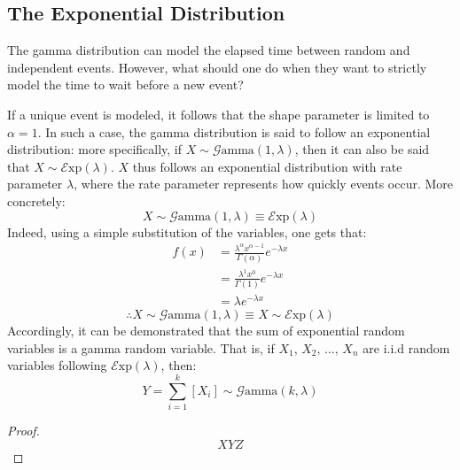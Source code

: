 \documentclass[12pt]{article}
\newcommand{\E}{\mathcal{E}}
\newcommand{\G}{\mathcal{G}}
\begin{document}
\pagebreak
\subsection{The Exponential Distribution }
The gamma distribution can model the elapsed time between random and independent events. However, what should one do
when they want to strictly model the time to wait before a new event?

If a unique event is modeled, it follows that the shape parameter is limited to $\alpha = 1$. In such a case, the gamma
distribution is said to follow an exponential distribution: more specifically, if $X\sim\G\text{amma}(1, \lambda)$, then
it can also be said that $X\sim\E\text{xp}(\lambda)$. $X$ thus follows an exponential distribution with rate parameter
$\lambda$, where the rate parameter represents how quickly events occur. More concretely:
\begin{equation}
	X\sim\G\text{amma}(1, \lambda)\equiv\E\text{xp}(\lambda)
\end{equation}
Indeed, using a simple substitution of the variables, one gets that:
\begin{equation}\label{eq:relation:exp}
	\begin{split}
		f(x)	&=	\frac{\lambda^\alpha x^{\alpha-1}}{\Gamma(\alpha)}e^{-\lambda x}\\
				&=	\frac{\lambda^1 x^{0}}{\Gamma(1)}e^{-\lambda x}\\
				&=	\lambda e^{-\lambda x}
	\end{split}
\end{equation}
\begin{equation}
	\therefore X\sim\G\text{amma}(1, \lambda)\equiv X\sim\E\text{xp}(\lambda)
\end{equation}
Accordingly, it can be demonstrated that the sum of exponential random variables is a gamma random variable. That is, if
$X_1,\,X_2,\,\ldots,\,X_n$ are i.i.d random variables following $\E\text{xp}(\lambda)$, then:
\begin{equation}
	Y=\sum^k_{i=1}\left[X_i\right]\sim\G\text{amma}(k, \lambda)
\end{equation}
\begin{proof}
	\begin{equation}
		XYZ
	\end{equation}
\end{proof}
\end{document}
